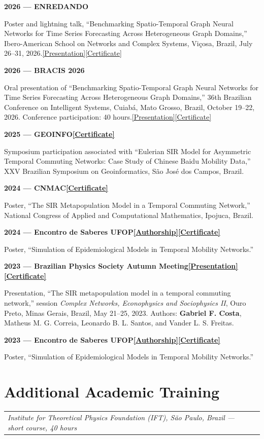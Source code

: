 \documentclass[10pt]{article}
\makeatletter
\newcommand{\proof}[1]{\nobreak\hspace{0.22em}\href{#1}{\textcolor{accent}{\raisebox{0.05ex}{\scriptsize$\nearrow$}}}}
\newcommand{\doclink}[2]{\nobreak\hspace{0.22em}\href{#1}{{\footnotesize\color{accent}[#2]}}}
\newcommand{\BRACISPresentationURL}{https://drive.google.com/file/d/1zyBz3UhjRjGobSGOrgOsJycLm6Waojwt/view?usp=drive_link}
\newcommand{\BRACISParticipationURL}{https://drive.google.com/file/d/1ROzB9hxb3h2EFg4ZewHrbCfQ0CJbUTAS/view?usp=drive_link}
\newcommand{\GEOINFOCertURL}{https://drive.google.com/file/d/1i5f444NoIGzHRU1sIV1cXE-_cM9z-jEO/view}
\newcommand{\CNMACCertURL}{https://drive.google.com/file/d/1bu6DheX8WSEYQNeRHVW5Z-IVWl7YGKRD/view}
\newcommand{\SaberesTwentyFourAuthURL}{https://drive.google.com/file/d/1FdeQIlAY7XsC58iQPjRLGR_lzgenU8_b/view}
\newcommand{\SaberesTwentyFourCertURL}{https://drive.google.com/file/d/1TUu0cyqr5NBSP_cgiD7Pv5DKfknjJUfK/view}
\newcommand{\SaberesTwentyThreeAuthURL}{https://drive.google.com/file/d/1MWM10QkC_0gOM05OC4-pDsqwHMbU08O5/view}
\newcommand{\SaberesTwentyThreeCertURL}{https://drive.google.com/file/d/1wfzpF-U2KYsZ-VD-rd-tgZLiV_Jpg8mX/view}
\newcommand{\EOSBFPosterURL}{https://drive.google.com/file/d/1PL9XmCC2E_Qmk3TOCF335ExlDewRfJd4/view}
\newcommand{\EOSBFCertURL}{https://drive.google.com/file/d/1-BuJeY7IzfOye8Pq_0irq5G95Ot4D8dH/view}
\newcommand{\SchoolURL}{https://drive.google.com/file/d/1O1wVULub8okaAm_f_OjA2A_iBkr7yReJ/view}
\newcommand{\ENREDANDOWorkURL}{https://drive.google.com/file/d/1JPgPdtn_2kcRAw7hrL8TwKLFYqtBKidv/view}
\newcommand{\ENREDANDOCertURL}{https://drive.google.com/file/d/1O7oA9hFp1pLahdar6dGv_X1fsRX6JR20/view}
\newcommand{\entry}[3]{%
  \needspace{2.5\baselineskip}%
  \begin{tabularx}{\linewidth}{@{}X>{\raggedleft\arraybackslash}p{2.35cm}@{}}
    \textbf{#1} & {\color{muted}\small #2}\\[-0.08em]
    \multicolumn{2}{@{}p{\linewidth}@{}}{{\itshape #3}}
  \end{tabularx}\par
}
\newcommand{\event}[2]{%
  \needspace{2.2\baselineskip}%
  {\bfseries\color{accent}#1}\par\nobreak
  #2\par\vspace{0.18em}
}
\makeatother
\begin{document}
\event{2026 --- ENREDANDO\proof{https://pages.giscbr.org/enredando2026/trabalhos.html}}{Poster and lightning talk, ``Benchmarking Spatio-Temporal Graph Neural Networks for Time Series Forecasting Across Heterogeneous Graph Domains,'' Ibero-American School on Networks and Complex Systems, Viçosa, Brazil, July 26--31, 2026.\doclink{\ENREDANDOWorkURL}{Presentation}\doclink{\ENREDANDOCertURL}{Certificate}}
\event{2026 --- BRACIS 2026}{Oral presentation of ``Benchmarking Spatio-Temporal Graph Neural Networks for Time Series Forecasting Across Heterogeneous Graph Domains,'' 36th Brazilian Conference on Intelligent Systems, Cuiabá, Mato Grosso, Brazil, October 19--22, 2026. Conference participation: 40 hours.\doclink{\BRACISPresentationURL}{Presentation}\doclink{\BRACISParticipationURL}{Certificate}}
\event{2025 --- GEOINFO\doclink{\GEOINFOCertURL}{Certificate}}{Symposium participation associated with ``Eulerian SIR Model for Asymmetric Temporal Commuting Networks: Case Study of Chinese Baidu Mobility Data,'' XXV Brazilian Symposium on Geoinformatics, São José dos Campos, Brazil.}
\event{2024 --- CNMAC\doclink{\CNMACCertURL}{Certificate}}{Poster, ``The SIR Metapopulation Model in a Temporal Commuting Network,'' National Congress of Applied and Computational Mathematics, Ipojuca, Brazil.}
\event{2024 --- Encontro de Saberes UFOP\doclink{\SaberesTwentyFourAuthURL}{Authorship}\doclink{\SaberesTwentyFourCertURL}{Certificate}}{Poster, ``Simulation of Epidemiological Models in Temporal Mobility Networks.''}
\event{2023 --- Brazilian Physics Society Autumn Meeting\doclink{\EOSBFPosterURL}{Presentation}\doclink{\EOSBFCertURL}{Certificate}}{Presentation, ``The SIR metapopulation model in a temporal commuting network,'' session \emph{Complex Networks, Econophysics and Sociophysics II}, Ouro Preto, Minas Gerais, Brazil, May 21--25, 2023. Authors: \textbf{Gabriel F. Costa}, Matheus M. G. Correia, Leonardo B. L. Santos, and Vander L. S. Freitas.}
\event{2023 --- Encontro de Saberes UFOP\doclink{\SaberesTwentyThreeAuthURL}{Authorship}\doclink{\SaberesTwentyThreeCertURL}{Certificate}}{Poster, ``Simulation of Epidemiological Models in Temporal Mobility Networks.''}

\section{Additional Academic Training}

\entry{II School on Modelling Infectious Disease Dynamics\doclink{\SchoolURL}{Certificate}}{2025}{Institute for Theoretical Physics Foundation (IFT), São Paulo, Brazil --- short course, 40 hours}
\end{document}
